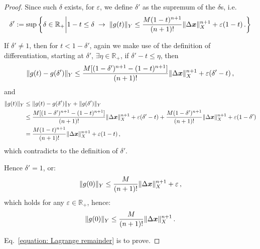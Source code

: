 \documentclass[openany]{book}
\begin{document}
\begin{proof}
	Since such $\delta$ exists, for $\varepsilon$, we define $\delta'$ as the supremum of the $\delta$s\cite[p.~64]{coleman2012calculus}, i.e.\ 
	\begin{equation*}
		\delta' := \sup \left\{
			\delta \in \mathbb R_+ 
			\middle| 
			1 - t \leq \delta \;\to\; \|g(t)\|_Y \leq \frac{M (1-t)^{n + 1}}{(n + 1)!} \|\Delta \boldsymbol{x}\|_X^{n+1} + \varepsilon (1 - t)\,.
		\right\}
	\end{equation*}

	If $\delta' \neq 1$, then for $ t < 1 - \delta'$, again we make use of the definition of differentiation, starting at $\delta'$, $\exists \eta \in \mathbb R_+$, if $\delta' - t \leq \eta$, then
	\begin{equation*}
		\|g(t) - g(\delta')\|_Y \leq \frac{M [(1-\delta')^{n + 1} - (1 - t)^{n+1}]}{(n + 1)!} \|\Delta \boldsymbol{x}\|_X^{n+1} + \varepsilon (\delta' - t) \,,
	\end{equation*}
	and
	\begin{align*}
		\|g(t)\|_Y &\leq \|g(t) - g(\delta')\|_Y + \|g(\delta')\|_Y
		\\
		&\leq \frac{M [(1-\delta')^{n + 1} - (1 - t)^{n+1}]}{(n + 1)!} \|\Delta \boldsymbol{x}\|_X^{n+1} 
			+ \varepsilon (\delta' - t) 
		+ \frac{M (1-\delta')^{n + 1}}{(n + 1)!} \|\Delta \boldsymbol{x}\|_X^{n+1} 
			+ \varepsilon (1 - \delta')
		\\
		&=  \frac{M (1-t)^{n + 1}}{(n + 1)!} \|\Delta \boldsymbol{x}\|_X^{n+1} + \varepsilon (1 - t)\,,
	\end{align*}
	which contradicts to the definition of $\delta'$.

	Hence $\delta' = 1$, or:
	\begin{equation*}
		\|g(0)\|_Y \leq \frac{M}{(n + 1)!} \|\Delta \boldsymbol{x}\|_X^{n+1} + \varepsilon\,,
	\end{equation*}
	which holds for any $\varepsilon \in \mathbb R_+$, hence:
	\begin{equation}\label{equation: Lagrange remainder}
		\|g(0)\|_Y \leq \frac{M}{(n + 1)!} \|\Delta \boldsymbol{x}\|_X^{n+1}\,.
	\end{equation}

	Eq.~\eqref{equation: Lagrange remainder} is to prove.
\end{proof}
\end{document}
